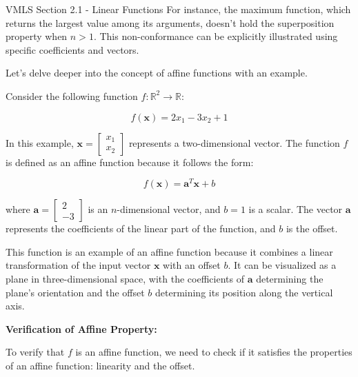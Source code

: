 \begin{notes}{VMLS Section 2.1 - Linear Functions}
    For instance, the maximum function, which returns the largest value among its arguments, doesn't hold the superposition property when \( n > 1 \). This non-conformance can be explicitly illustrated using specific coefficients and 
    vectors.
    
    \begin{highlight}
        Let's delve deeper into the concept of affine functions with an example. \vspace*{1em}

        
        Consider the following function \( f: \mathbb{R}^2 \rightarrow \mathbb{R} \):
        
        \[
        f(\mathbf{x}) = 2x_1 - 3x_2 + 1
        \]
        
        In this example, \( \mathbf{x} = \begin{bmatrix} x_1 \\ x_2 \end{bmatrix} \) represents a two-dimensional vector. The function \( f \) is defined as an affine function because it follows the form:
        
        \[
        f(\mathbf{x}) = \mathbf{a}^T \mathbf{x} + b
        \]
        
        where \( \mathbf{a} = \begin{bmatrix} 2 \\ -3 \end{bmatrix} \) is an \( n \)-dimensional vector, and \( b = 1 \) is a scalar. The vector \( \mathbf{a} \) represents the coefficients of the linear part of the function, and 
        \( b \) is the offset.
        
        This function is an example of an affine function because it combines a linear transformation of the input vector \( \mathbf{x} \) with an offset \( b \). It can be visualized as a plane in three-dimensional space, with the 
        coefficients of \( \mathbf{a} \) determining the plane's orientation and the offset \( b \) determining its position along the vertical axis.
        
        \vspace*{1em} \textbf{Verification of Affine Property:} \vspace*{1em}
        
        To verify that \( f \) is an affine function, we need to check if it satisfies the properties of an affine function: linearity and the offset.
        

\end{highlight}
\end{notes}
